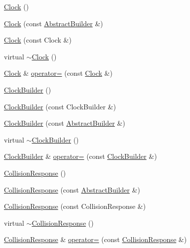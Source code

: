 \begin{DoxyCompactItemize}
\item 
\hyperlink{namespacejli_af69056b00744493ba074ef13e82b0bec}{Clock} ()
\item 
\hyperlink{namespacejli_a334855814780bf6b3108045f5bf20c40}{Clock} (const \hyperlink{classjli_1_1_abstract_builder}{Abstract\+Builder} \&)
\item 
\hyperlink{namespacejli_a7ce97585499e25f837d2b1a14a4af4ce}{Clock} (const Clock \&)
\item 
virtual \hyperlink{namespacejli_aad1ce3f2fd2e7830b0fed2a040647134}{$\sim$\+Clock} ()
\item 
\hyperlink{namespacejli_af69056b00744493ba074ef13e82b0bec}{Clock} \& \hyperlink{namespacejli_a1ff847178b6d16582b0c1ca11c646090}{operator=} (const \hyperlink{namespacejli_af69056b00744493ba074ef13e82b0bec}{Clock} \&)
\item 
\hyperlink{namespacejli_af9355f336950e30078eac279a96a7375}{Clock\+Builder} ()
\item 
\hyperlink{namespacejli_a59f88ada47f2f75bad05d58b79344dd1}{Clock\+Builder} (const Clock\+Builder \&)
\item 
\hyperlink{namespacejli_a6eb2d97c9c7e59378580ac6637daf99c}{Clock\+Builder} (const \hyperlink{classjli_1_1_abstract_builder}{Abstract\+Builder} \&)
\item 
virtual \hyperlink{namespacejli_aedf4fd3834c4b8806fa9a257d496df30}{$\sim$\+Clock\+Builder} ()
\item 
\hyperlink{namespacejli_af9355f336950e30078eac279a96a7375}{Clock\+Builder} \& \hyperlink{namespacejli_ab2df9e6084dba760e66f854ddaed69ff}{operator=} (const \hyperlink{namespacejli_af9355f336950e30078eac279a96a7375}{Clock\+Builder} \&)
\item 
\hyperlink{namespacejli_ade7f2a4f2880c0d04736c3677ff61c1a}{Collision\+Response} ()
\item 
\hyperlink{namespacejli_a5253cd6674cbb5acad943c6652f1941d}{Collision\+Response} (const \hyperlink{classjli_1_1_abstract_builder}{Abstract\+Builder} \&)
\item 
\hyperlink{namespacejli_aa016cba40071d115792a6ab008cc30c5}{Collision\+Response} (const Collision\+Response \&)
\item 
virtual \hyperlink{namespacejli_ad8c3da9eb7afceee20db6db716280ce0}{$\sim$\+Collision\+Response} ()
\item 
\hyperlink{namespacejli_ade7f2a4f2880c0d04736c3677ff61c1a}{Collision\+Response} \& \hyperlink{namespacejli_ac9b74cda6418ae6175a9178669229562}{operator=} (const \hyperlink{namespacejli_ade7f2a4f2880c0d04736c3677ff61c1a}{Collision\+Response} \&)

\end{DoxyCompactItemize}
